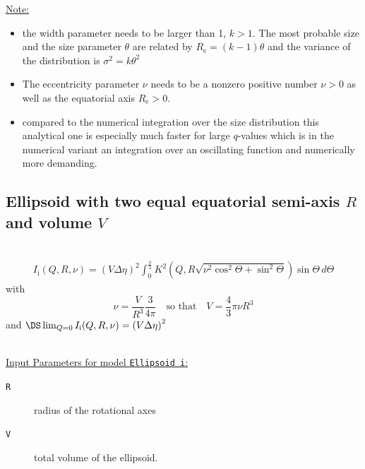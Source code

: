 \underline{Note:}
\begin{itemize}
\item the width parameter needs to be larger than 1, $k>1$. The most probable size and the size parameter $\theta$ are related by $R_\mathrm{e} = (k-1) \theta$ and the variance of the distribution is $\sigma^2 = k \theta^2$
\item The eccentricity parameter $\nu$ needs to be a nonzero positive number $\nu>0$ as well as the equatorial axis $R_\mathrm{e}>0$.
\item compared to the numerical integration over the size distribution this analytical one is especially much faster for large $q$-values which is in the numerical variant an integration over an oscillating function and numerically more demanding.
\end{itemize}

\clearpage
\subsection{Ellipsoid with two equal equatorial semi-axis $R$ and volume $V$}
\label{sect:Ellipsoid_i} ~\\

\begin{align}
I_\text{i}(Q,R,\nu) = \left( V \Delta\eta
\right)^2
 \int_0^{\frac{\pi}{2}}\! K^2\left(Q,R\sqrt{\nu^2\cos^2\Theta+\sin^2\Theta}\right)\sin\Theta\, d\Theta
\end{align}
with
$$
\nu=\frac{V}{R^3}\frac{3}{4\pi} \quad \mbox{so that}\quad V =\frac{4}{3}\pi\nu R^3
$$
and $\DS \lim_{Q=0} I_\text{i}(Q,R,\nu)= \left(V\Delta\eta\right)^2$

~\\
\underline{Input Parameters for model \texttt{Ellipsoid i}:}
\begin{description}
\item[\texttt{R}] radius of the rotational axes
\item[\texttt{V}] total volume of the ellipsoid.
\end{description}

